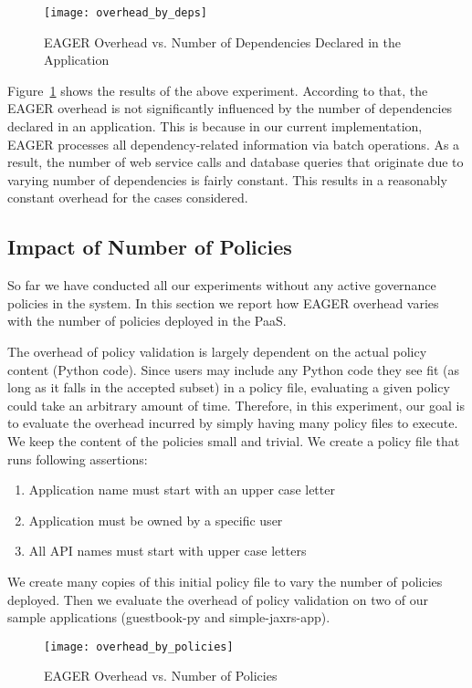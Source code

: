 \begin{figure}
\centering
\texttt{[image: overhead\_by\_deps]}
\caption{EAGER Overhead vs. Number of Dependencies Declared in the Application}
\label{fig:overhead_by_deps}
\end{figure}

Figure~\ref{fig:overhead_by_deps} shows the results of the above experiment. According to that, the EAGER overhead is not significantly
influenced by the number of dependencies declared in an application. This is because in our current implementation, EAGER processes
all dependency-related information via batch operations. 
As a result, the number of web service calls and database queries that originate due to varying number of dependencies
is fairly constant. This results in a reasonably constant overhead for the cases considered.

\subsection{Impact of Number of Policies}

So far we have conducted all our experiments without any active governance policies in the system. In this section we report how EAGER overhead
varies with the number of policies deployed in the PaaS. 

The overhead of policy validation is largely dependent
on the actual policy content (Python code). Since users may include any Python code they see fit (as long as it
falls in the accepted subset) in a policy file, evaluating a given policy could take an arbitrary amount of time. Therefore, in this experiment, our
goal is to evaluate the overhead incurred by simply having many policy files to execute. We keep the content of the policies
small and trivial. We create a policy file that runs following assertions:
\begin{enumerate}
\item Application name must start with an upper case letter
\item Application must be owned by a specific user
\item All API names must start with upper case letters
\end{enumerate}
We create many copies of this initial policy file to vary the number of policies deployed. Then we evaluate the overhead of policy validation
on two of our sample applications (guestbook-py and simple-jaxrs-app). 

\begin{figure}
\centering
\texttt{[image: overhead\_by\_policies]}
\caption{EAGER Overhead vs. Number of Policies}
\label{fig:overhead_by_policies}
\end{figure}

